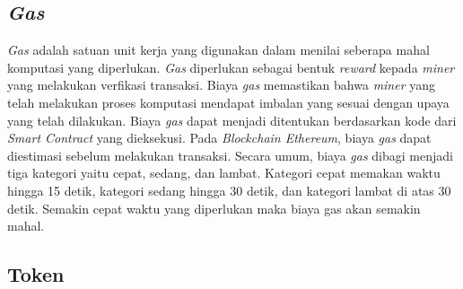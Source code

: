 \subsection{\emph{Gas}}

\emph{Gas} adalah satuan unit kerja yang digunakan dalam menilai seberapa mahal komputasi yang diperlukan. \emph{Gas} diperlukan sebagai bentuk \emph{reward} kepada \emph{miner} yang melakukan verfikasi transaksi. Biaya \emph{gas} memastikan bahwa \emph{miner} yang telah melakukan proses komputasi mendapat imbalan yang sesuai dengan upaya yang telah dilakukan. Biaya \emph{gas} dapat menjadi ditentukan berdasarkan kode dari \emph{Smart Contract} yang dieksekusi. Pada \emph{Blockchain Ethereum}, biaya \emph{gas} dapat diestimasi sebelum melakukan transaksi. Secara umum, biaya \emph{gas} dibagi menjadi tiga kategori yaitu cepat, sedang, dan lambat. Kategori cepat memakan waktu hingga 15 detik, kategori sedang hingga 30 detik, dan kategori lambat di atas 30 detik. Semakin cepat waktu yang diperlukan maka biaya gas akan semakin mahal.  
\parencite{DannenChris}

\subsection{Token}


